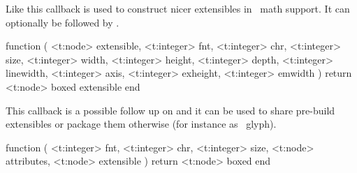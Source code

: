 \stopsubsection

\startsubsection[title=make_extensible]

Like  this callback is used to construct nicer extensibles in \CONTEXT\
math support. It can optionally be followed by .

\starttyping[option=LUA]
function (
    <t:node>    extensible,
    <t:integer> fnt,
    <t:integer> chr,
    <t:integer> size,
    <t:integer> width,
    <t:integer> height,
    <t:integer> depth,
    <t:integer> linewidth,
    <t:integer> axis,
    <t:integer> exheight,
    <t:integer> emwidth
)
    return <t:node> boxed extensible
end
\stoptyping

\stopsubsection

\startsubsection[title=register_extensible]

This callback is a possible follow up on  and it can be
used to share pre-build extensibles or package them otherwise (for instance as
\TYPETHREE\ glyph).

\starttyping[option=LUA]
function (
    <t:integer> fnt,
    <t:integer> chr,
    <t:integer> size,
    <t:node>    attributes,
    <t:node>    extensible
)
    return <t:node> boxed
end
\stoptyping

\stopsubsection

\stopsection

\stopdocument

